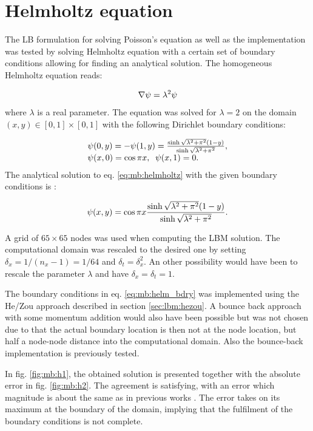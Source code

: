 \section{Helmholtz equation}
The LB formulation for solving Poisson's equation as well as the
implementation was tested by solving Helmholtz equation with a
certain set of boundary conditions allowing for finding an analytical
solution. The homogeneous Helmholtz equation reads:

\begin{equation}\label{eq:mb:helmholtz}
\nabla \mathrm{\psi} = \lambda^2 \mathrm{\psi}
\end{equation}
where $\lambda$ is a real parameter. The equation was solved for
$\lambda = 2$ on the domain $(x, y)\in[0, 1]\times[0, 1]$ with the
following Dirichlet boundary conditions:

\begin{equation}\label{eq:mb:helm_bdry}
  \begin{array}{l l}
\mathrm{\psi}(0, y) = -\mathrm{\psi}(1, y) = \frac{\sinh\sqrt{\lambda^2 + \pi^2}(1 -
  y)}{\sinh\sqrt{\lambda^2 + \pi^2}},\\ \mathrm{\psi}(x, 0) =
\cos\pi x,\;\; \mathrm{\psi}(x, 1) = 0.
\end{array}
\end{equation}
The analytical solution to eq. \eqref{eq:mb:helmholtz} with the given
boundary conditions is \cite{chai_poi}:

\begin{equation}
\mathrm{\psi}(x, y) = \cos\pi x \frac{\sinh\sqrt{\lambda^2 + \pi^2}(1 -
  y)}{\sinh\sqrt{\lambda^2 + \pi^2}}.
\end{equation}

A grid of $65\times65$ nodes was used when computing the LBM
solution. The computational domain was rescaled to the desired one by
setting $\delta_x = 1/(n_x-1) = 1/64$ and $\delta_t = \delta_x^2$. An
other possibility would have been to rescale the parameter $\lambda$
and have $\delta_x = \delta_t = 1$.

The boundary conditions in eq. \eqref{eq:mb:helm_bdry} was implemented
using the He/Zou approach described in section \ref{sec:lbm:hezou}. A
bounce back approach with some momentum addition would also have been
possible but was not chosen due to that the actual boundary location
is then not at the node location, but half a node-node distance into the
computational domain. Also the bounce-back implementation is
previously tested. 

In fig. \ref{fig:mb:h1}, the obtained solution is presented together
with the absolute error in fig. \ref{fig:mb:h2}. The agreement is
satisfying, with an error which magnitude is about the same as in
previous works \cite{chai_poi}. The error takes on its maximum at the
boundary of the domain, implying that the fulfilment of the boundary
conditions is not complete.

